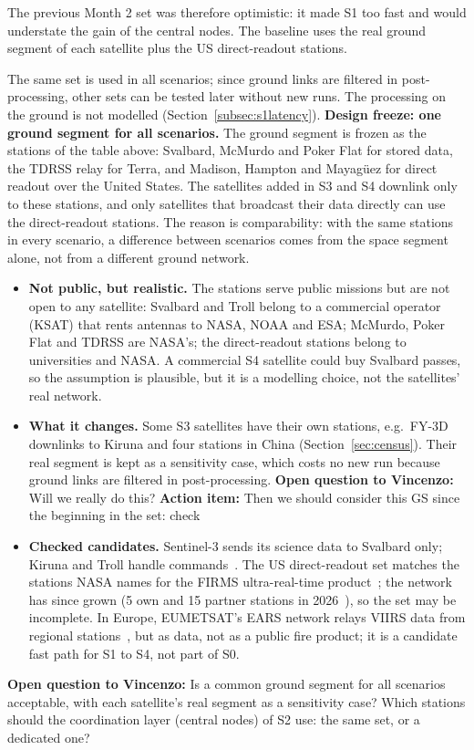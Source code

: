 \documentclass[11pt]{article}
\newcommand{\vincenzoq}[1]{\textcolor{vincenzoq}{\textbf{Open question to Vincenzo:}} #1}
\newcommand{\actionitem}[1]{\textcolor{todo}{\textbf{Action item:}} #1}
\begin{document}
The previous Month 2 set was therefore optimistic: it made S1 too fast and would understate the gain of the central nodes. The baseline uses the real ground segment of each satellite plus the US direct-readout stations. 

The same set is used in all scenarios; since ground links are filtered in post-processing, other sets can be tested later without new runs. The processing on the ground is not modelled (Section~\ref{subsec:s1latency}). \textbf{Design freeze: one ground segment for all scenarios.} The ground segment is frozen as the stations of the table above: Svalbard, McMurdo and Poker Flat for stored data, the TDRSS relay for Terra, and Madison, Hampton and Mayag\"uez for direct readout over the United States. The satellites added in S3 and S4 downlink only to these stations, and only satellites that broadcast their data directly can use the direct-readout stations. The reason is comparability: with the same stations in every scenario, a difference between scenarios comes from the space segment alone, not from a different ground network.
\begin{itemize}[leftmargin=1.2cm]
    \item \textbf{Not public, but realistic.} The stations serve public missions but are not open to any satellite: Svalbard and Troll belong to a commercial operator (KSAT) that rents antennas to NASA, NOAA and ESA; McMurdo, Poker Flat and TDRSS are NASA's; the direct-readout stations belong to universities and NASA. A commercial S4 satellite could buy Svalbard passes, so the assumption is plausible, but it is a modelling choice, not the satellites' real network.
    \item \textbf{What it changes.} Some S3 satellites have their own stations, e.g.\ FY-3D downlinks to Kiruna and four stations in China (Section~\ref{sec:census}). Their real segment is kept as a sensitivity case, which costs no new run because ground links are filtered in post-processing. \vincenzoq{Will we really do this?} \actionitem{Then we should consider this GS since the beginning in the set: check}
    \item \textbf{Checked candidates.} Sentinel-3 sends its science data to Svalbard only; Kiruna and Troll handle commands~\cite{esa2026s3dataflow}. The US direct-readout set matches the stations NASA names for the FIRMS ultra-real-time product~\cite{nasa2022firmsurt}; the network has since grown (5 own and 15 partner stations in 2026~\cite{flynn2026dbrtn}), so the set may be incomplete. In Europe, EUMETSAT's EARS network relays VIIRS data from regional stations~\cite{eumetsat2022viirs}, but as data, not as a public fire product; it is a candidate fast path for S1 to S4, not part of S0.
\end{itemize}
\vincenzoq{Is a common ground segment for all scenarios acceptable, with each satellite's real segment as a sensitivity case? Which stations should the coordination layer (central nodes) of S2 use: the same set, or a dedicated one?}
\end{document}
